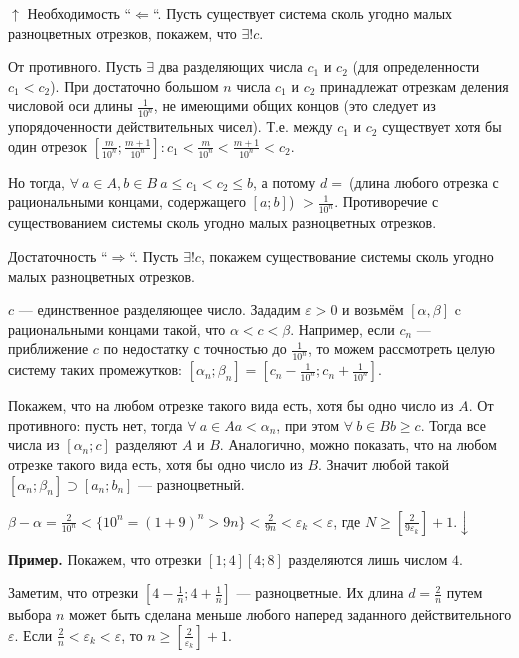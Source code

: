 \documentclass{article}
\begin{document}
        $\uparrow$ Необходимость ``$\Leftarrow$``. Пусть существует система сколь угодно малых разноцветных отрезков, покажем, что $\exists! c$. 

        От противного. Пусть $\exists$ два разделяющих числа $c_1$ и $c_2$ (для определенности $c_1 < c_2$). При достаточно большом $n$ числа $c_1$ и $c_2$ принадлежат отрезкам деления числовой оси длины $\frac{1}{10^n}$, не имеющими общих концов (это следует из упорядоченности действительных чисел). Т.е. между $c_1$ и $c_2$ существует хотя бы один отрезок $[\frac{m}{10^n}; \frac{m + 1}{10^n}]: c_1 < \frac{m}{10^n} < \frac{m + 1}{10^n} < c_2$.
        
        Но тогда, $\forall\ a \in A, b \in B\ a \leq c_1 < c_2 \leq b$, а потому $d =\ $(длина любого отрезка с рациональными концами, содержащего $[a; b]$) $> \frac{1}{10^n}$. Противоречие с существованием системы сколь угодно малых разноцветных отрезков.

        Достаточность ``$\Rightarrow$``. Пусть $\exists! c$, покажем существование системы сколь угодно малых разноцветных отрезков.

        $c$ --- единственное разделяющее число. Зададим $\varepsilon > 0$ и возьмём $[\alpha, \beta]$ c рациональными концами такой, что $\alpha < c < \beta$. Например, если $c_n$ --- приближение $c$ по недостатку с точностью до $\frac{1}{10^n}$, то можем рассмотреть целую систему таких промежутков: $[\alpha_n; \beta_n] = [c_n - \frac{1}{10^n}; c_n + \frac{1}{10^n}]$. 

        Покажем, что на любом отрезке такого вида есть, хотя бы одно число из $A$. От противного: пусть нет, тогда $\forall\ a \in A a < \alpha_n$, при этом $\forall\ b \in B b \geq c$. Тогда все числа из $[\alpha_n; c]$ разделяют $A$ и $B$. Аналогично, можно показать, что на любом отрезке такого вида есть, хотя бы одно число из $B$. Значит любой такой $[\alpha_n; \beta_n] \supset [a_n; b_n]$ --- разноцветный.

        $\beta - \alpha = \frac{2}{10^n} < \{10^n = (1 + 9)^n > 9n\} < \frac{2}{9n} < \varepsilon_k < \varepsilon$, где $N \geq [\frac{2}{9 \varepsilon_k}] + 1. \downarrow$ 

        \textbf{Пример.} Покажем, что отрезки $[1; 4] [4; 8]$ разделяются лишь числом $4$.
        
        Заметим, что отрезки $[4 - \frac{1}{n}; 4 + \frac{1}{n}]$ --- разноцветные. Их длина $d = \frac{2}{n}$ путем выбора $n$ может быть сделана меньше любого наперед заданного действительного $\varepsilon$. Если $\frac{2}{n} < \varepsilon_k < \varepsilon$, то $n \geq [\frac{2}{\varepsilon_k}] + 1$. 
\end{document}
